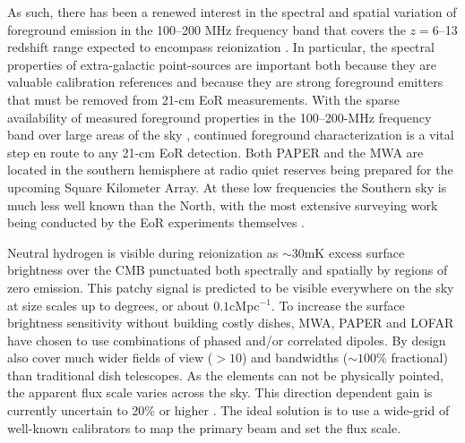 \documentclass[preprint]{aastex}
\begin{document}
As such, there has been a renewed interest in the spectral and spatial variation of
foreground emission in the 100--200 MHz frequency band that covers
the $z=6$--13 redshift range expected to encompass reionization
\citep{furlanetto_et_al2006}.
In particular, the spectral properties of extra-galactic point-sources are important
both because they are valuable calibration references
and because they are strong foreground emitters that must be removed from 21-cm EoR measurements.
With the sparse availability of measured foreground properties in the
100--200-MHz frequency band over large areas of the sky \citep{deolivieracosta_et_al2008}, continued
foreground characterization is a
vital step en route to any 21-cm EoR detection.
Both PAPER and the MWA are located in the southern hemisphere at radio quiet
reserves being prepared for the upcoming Square Kilometer Array.  At these low
frequencies the Southern sky is much less well known than the North, with the
most extensive surveying work being conducted  by the EoR experiments
themselves \citep{Jacobs:2011p8438,Williams:2012p8768}.
  
Neutral hydrogen is visible during reionization as $\sim$30mK excess surface
brightness over the CMB punctuated both spectrally and spatially by regions of
zero emission.  This patchy signal is predicted to be visible everywhere on the
sky at size scales up to degrees, or about $0.1$cMpc$^{-1}$.   To increase the
surface brightness sensitivity without building costly dishes, MWA, PAPER and
LOFAR have chosen to use combinations of phased and/or correlated dipoles. By
design also cover much wider fields of view ($>10$\arcdeg) and bandwidths
($\sim 100$\% fractional) than traditional dish telescopes.   As the elements
can not be physically pointed, the apparent flux scale varies across the sky.
This direction dependent gain is currently uncertain to 20\% or higher
\citep{Jacobs:2013p9713}.  The ideal solution is to use a wide-grid of
well-known calibrators to map the primary beam and set the flux scale.  

\end{document}
